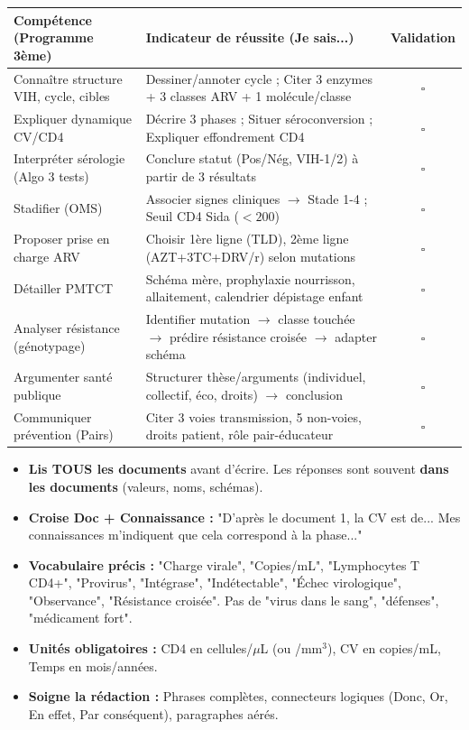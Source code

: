 \documentclass[11pt]{article}
\begin{document}
\begin{center}
\begin{tabularx}{\linewidth}{|l|X|c|}\hline
\textbf{Compétence (Programme 3ème)} & \textbf{Indicateur de réussite (Je sais...)} & \textbf{Validation} \\ \hline
Connaître structure VIH, cycle, cibles & Dessiner/annoter cycle ; Citer 3 enzymes + 3 classes ARV + 1 molécule/classe & $\square$ \\ \hline
Expliquer dynamique CV/CD4 & Décrire 3 phases ; Situer séroconversion ; Expliquer effondrement CD4 & $\square$ \\ \hline
Interpréter sérologie (Algo 3 tests) & Conclure statut (Pos/Nég, VIH-1/2) à partir de 3 résultats & $\square$ \\ \hline
Stadifier (OMS) & Associer signes cliniques $\to$ Stade 1-4 ; Seuil CD4 Sida ($< 200$) & $\square$ \\ \hline
Proposer prise en charge ARV & Choisir 1ère ligne (TLD), 2ème ligne (AZT+3TC+DRV/r) selon mutations & $\square$ \\ \hline
Détailler PMTCT & Schéma mère, prophylaxie nourrisson, allaitement, calendrier dépistage enfant & $\square$ \\ \hline
Analyser résistance (génotypage) & Identifier mutation $\to$ classe touchée $\to$ prédire résistance croisée $\to$ adapter schéma & $\square$ \\ \hline
Argumenter santé publique & Structurer thèse/arguments (individuel, collectif, éco, droits) $\to$ conclusion & $\square$ \\ \hline
Communiquer prévention (Pairs) & Citer 3 voies transmission, 5 non-voies, droits patient, rôle pair-éducateur & $\square$ \\ \hline
\end{tabularx}
\end{center}

\begin{attention}
\begin{itemize}
\item \textbf{Lis TOUS les documents} avant d'écrire. Les réponses sont souvent \textbf{dans les documents} (valeurs, noms, schémas).
\item \textbf{Croise Doc + Connaissance :} "D'après le document 1, la CV est de... Mes connaissances m'indiquent que cela correspond à la phase..."
\item \textbf{Vocabulaire précis :} "Charge virale", "Copies/mL", "Lymphocytes T CD4+", "Provirus", "Intégrase", "Indétectable", "Échec virologique", "Observance", "Résistance croisée". Pas de "virus dans le sang", "défenses", "médicament fort".
\item \textbf{Unités obligatoires :} CD4 en cellules/$\mu$L (ou /mm$^3$), CV en copies/mL, Temps en mois/années.
\item \textbf{Soigne la rédaction :} Phrases complètes, connecteurs logiques (Donc, Or, En effet, Par conséquent), paragraphes aérés.
\end{itemize}
\end{attention}
\end{document}
